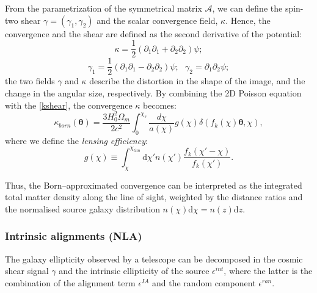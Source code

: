 \documentclass{aa}
\begin{document}
From the parametrization of the symmetrical matrix $\mathcal{A}$, we can define the spin-two shear $\gamma=(\gamma_1,\gamma_2)$ and the scalar convergence field, $\kappa$. 
Hence, the convergence and the shear are defined as the second derivative of the potential:
\begin{equation}\label{kshear}
    \kappa=\frac{1}{2}(\partial_1\partial_1+\partial_2\partial_2)\psi;  
\end{equation}
\begin{equation}
 \gamma_1=\frac{1}{2}(\partial_1\partial_1-\partial_2\partial_2)\psi; \  \  \
 \gamma_2=\partial_1\partial_2\psi;   
\end{equation}
the two fields $\gamma$ and $\kappa$ describe the distortion in the shape of the image, and the change in the angular size, respectively.
By combining the 2D Poisson equation with the \autoref{kshear}, the convergence $\kappa$ becomes:
\begin{equation}\label{born_approx}
    \kappa_{born}(\boldsymbol{\theta})= \frac{3H_0^2 \Omega_m}{2c^2}
    \int_0^{\chi_s} 
    \frac{d\chi}{a(\chi)}
    g(\chi)
    \delta(f_k(\chi)\boldsymbol{\theta},\chi),
\end{equation}
where we define the \textit{lensing efficiency}:
\begin{equation}
   g(\chi) \equiv
  \int_{\chi}^{\chi_{lim}} \text{d}\chi'
   n(\chi')
    \frac{f_k(\chi'-\chi)}{f_k(\chi')}.
\end{equation}


Thus, the Born–approximated convergence can be interpreted as the integrated total matter density along the line of sight, weighted by the distance ratios and the normalised source galaxy  distribution $n(\chi)$d$\chi=n(z)$d$z$.

\subsubsection{Intrinsic alignments (NLA)}

The galaxy ellipticity observed by a telescope can be decomposed in the cosmic shear signal $\gamma$ and the intrinsic ellipticity of the source $\epsilon^{int}$, where the latter is the combination of the alignment term $\epsilon^{IA}$ and the random component $\epsilon^{ran}$.
\end{document}
